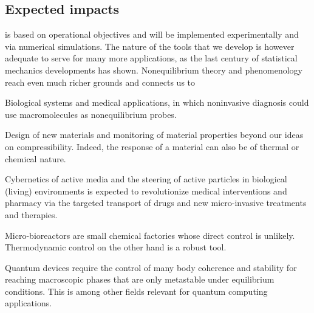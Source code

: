 \subsection{Expected impacts}


\TheProject is based on operational objectives and will be implemented experimentally and
via numerical simulations.
%
The nature of the tools that we develop is however adequate to serve for many more
applications, as the last century of statistical mechanics developments has shown.
%
Nonequilibrium theory and phenomenology reach even much richer grounds and connects us to
\begin{compactitem}
\item Biological systems and medical applications, in which noninvasive diagnosis could use
macromolecules as nonequilibrium probes.
\item Design of new materials and monitoring of material properties beyond our ideas on
compressibility. Indeed, the response of a material can also be of thermal or chemical
nature.
\item Cybernetics of active media and the steering of active particles in biological
(living) environments is expected to revolutionize medical interventions and pharmacy via
the targeted transport of drugs and new micro-invasive treatments and therapies.
\item Micro-bioreactors are small chemical factories whose direct control is
unlikely. Thermodynamic control on the other hand is a robust tool.
\item Quantum devices require the control of many body coherence and stability for reaching
macroscopic phases that are only metastable under equilibrium conditions. This is among
other fields relevant for quantum computing applications.
\end{compactitem}

